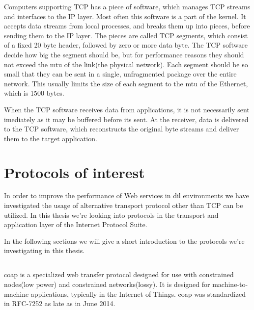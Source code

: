 Computers supporting TCP has a piece of software, which manages TCP streams and
interfaces to the IP layer. Most often this software is a part of the
kernel\cite{computer-networks}. It accepts data streams from local processes,
and breaks them up into pieces, before sending them to the IP layer. The pieces
are called TCP segments, which consist of a fixed 20 byte header, followed by
zero or more data byte. The TCP software decide how big the segment should be,
but for performance reasons they should not exceed the \gls{mtu} of the
link(the physical network). Each segment should be so small that they can be
sent in a single, unfragmented package over the entire network. This usually
limits the size of each segment to the \gls{mtu} of the Ethernet, which is 1500
bytes.

When the TCP software receives data from applications, it is not necessarily
sent imediately as it may be buffered before its sent. At the receiver, data is
delivered to the TCP software, which reconstructs the original byte streams and
deliver them to the target application.


\section{Protocols of interest}


In order to improve the performance of Web services in \gls{dil} environments we
have investigated the usage of alternative transport protocol other than TCP can
be utilized. In this thesis we're looking into protocols in the transport and
application layer of the Internet Protocol Suite\cite{rfc-1122}.

In the following sections we will give a short introduction to the protocols
we're investigating in this thesis.



\subsection{}

\gls{coap} is a specialized web transfer protocol designed for use with
constrained nodes(low power) and constrained networks(lossy)\cite{rfc-7252}. It
is designed for machine-to-machine applications, typically in the Internet of
Things. \gls{coap} was standardized in RFC-7252 as late as in June 2014.

